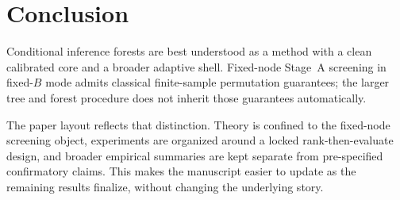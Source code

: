 \section{Conclusion}
\label{sec:conclusion}

Conditional inference forests are best understood as a method with a clean
calibrated core and a broader adaptive shell. Fixed-node Stage~A screening in
fixed-$B$ mode admits classical finite-sample permutation guarantees; the
larger tree and forest procedure does not inherit those guarantees
automatically.

The paper layout reflects that distinction. Theory is confined to the
fixed-node screening object, experiments are organized around a locked
rank-then-evaluate design, and broader empirical summaries are kept separate
from pre-specified confirmatory claims. This makes the manuscript easier to
update as the remaining results finalize, without changing the underlying
story.
